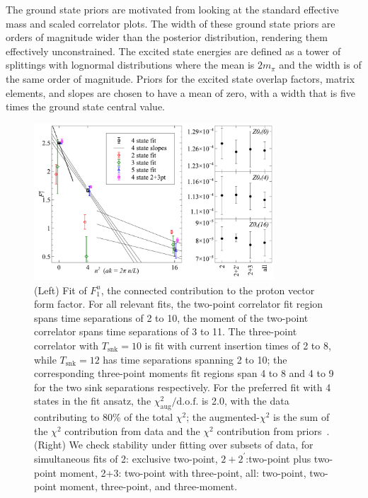 \documentclass{PoS}
\begin{document}
The ground state priors are motivated from looking at the standard effective mass and scaled correlator plots. The width of these ground state priors are orders of magnitude wider than the posterior distribution, rendering them effectively unconstrained. The excited state energies are defined as a tower of splittings with lognormal distributions where the mean is $2m_\pi$ and the width is of the same order of magnitude. Priors for the excited state overlap factors, matrix elements, and slopes are chosen to have a mean of zero, with a width that is five times the ground state central value.

\begin{figure}[h]
	\centering
		\includegraphics[width=0.8\textwidth]{./gV.pdf}
	\caption{(Left) Fit of $F_1^u$, the connected contribution to the proton vector form factor. For all relevant fits, the two-point correlator fit region spans time separations of 2 to 10, the moment of the two-point correlator spans time separations of 3 to 11. The three-point correlator with $T_{\text{snk}}=10$ is fit with current insertion times of 2 to 8, while $T_{\text{snk}}=12$ has time separations spanning 2 to 10; the corresponding three-point moments fit regions span 4 to 8 and 4 to 9 for the two sink separations respectively. For the preferred fit with 4 states in the fit ansatz, the $\chi^2_\text{aug}/\text{d.o.f.}$ is 2.0, with the data contributing to 80\% of the total $\chi^2$; the augmented-$\chi^2$ is the sum of the $\chi^2$ contribution from data and the $\chi^2$ contribution from priors~\cite{Lepage:2001ym}. (Right) We check stability under fitting over subsets of data, for simultaneous fits of 2: exclusive two-point, $2+2^\prime$:two-point plus two-point moment, 2+3: two-point with three-point, all: two-point, two-point moment, three-point, and three-moment.}
	\label{fig:gV}
\end{figure}
\end{document}
